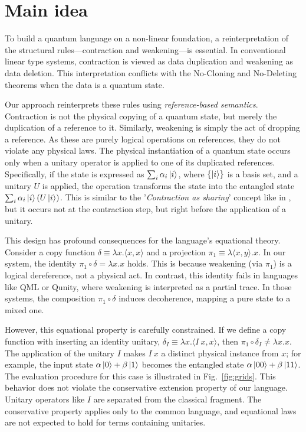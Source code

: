 
\section{Main idea} \label{sec:main-idea}
To build a quantum language on a non-linear foundation, a reinterpretation of the structural rules---contraction and weakening---is essential.
In conventional linear type systems, contraction is viewed as data duplication and weakening as data deletion.
This interpretation conflicts with the No-Cloning and No-Deleting theorems when the data is a quantum state.

Our approach reinterprets these rules using \textit{reference-based semantics}.
Contraction is not the physical copying of a quantum state, but merely the duplication of a reference to it.
Similarly, weakening is simply the act of dropping a reference.
As these are purely logical operations on references, they do not violate any physical laws.
The physical instantiation of a quantum state occurs only when a unitary operator is applied to one of its duplicated references.
Specifically, if the state is expressed as $\sum_i\alpha_i\ket{i}$, where $\{\ket{i}\}$ is a basis set, and a unitary $U$ is applied, the operation transforms the state into the entangled state $\sum_i\alpha_i\ket{i}(U\ket{i})$.
This is similar to the '\textit{Contraction as sharing}' concept like in \cite{ALTENKIRCH2005_FunctionalQuantumProgramming,ARRIGHI2004_OperationalSemanticsFormal}, but it occurs not at the contraction step, but right before the application of a unitary.

This design has profound consequences for the language's equational theory.
Consider a copy function $\delta \equiv \lambda x.\langle x,x\rangle$ and a projection $\pi_1 \equiv \lambda\langle x,y\rangle.x$. In our system, the identity $\pi_1\circ\delta=\lambda x. x$ holds.
This is because weakening (via $\pi_1$) is a logical dereference, not a physical act.
In contrast, this identity fails in languages like QML\cite{ALTENKIRCH2005_FunctionalQuantumProgramming} or Qunity\cite{VOICHICK2023_QunityUnifiedLanguage}, where weakening is interpreted as a partial trace.
In those systems, the composition $\pi_1\circ\delta$ induces decoherence, mapping a pure state to a mixed one.

However, this equational property is carefully constrained.
If we define a copy function with inserting an identity unitary, $\delta_I \equiv \lambda x.\langle I\ x,x\rangle$, then $\pi_1\circ\delta_I\ne\lambda x.x$.
The application of the unitary $I$ makes $I\ x$ a distinct physical instance from $x$; for example, the input state $\alpha\ket{0}+\beta\ket{1}$ becomes the entangled state $\alpha\ket{00}+\beta\ket{11}$.
The evaluation procedure for this case is illustrated in Fig.~\ref{fig:grids}.
This behavior does not violate the conservative extension property of our language.
Unitary operators like $I$ are separated from the classical fragment.
The conservative property applies only to the common language, and equational laws are not expected to hold for terms containing unitaries.

